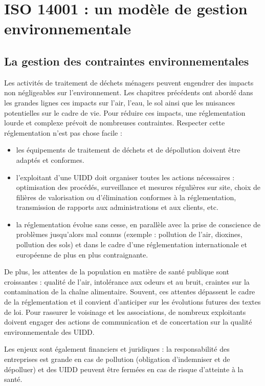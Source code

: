 \section{ISO 14001 : un modèle de gestion environnementale}

\subsection{La gestion des contraintes environnementales}

Les activités de traitement de déchets ménagers peuvent engendrer des impacts non 
négligeables sur l’environnement. Les chapitres précédents ont abordé dans les grandes lignes ces impacts sur l’air, l’eau, le sol ainsi que les nuisances potentielles sur le cadre de vie. 
Pour réduire ces impacts, une réglementation lourde et complexe prévoit de nombreuses contraintes. Respecter cette réglementation n’est pas chose facile : 

\begin{itemize}
\item les équipements de traitement de déchets et de dépollution doivent être adaptés et conformes. 
\item l’exploitant d’une UIDD doit organiser toutes les actions nécessaires : optimisation des procédés, surveillance et mesures régulières sur site, choix de filières de valorisation ou d’élimination conformes à la réglementation, transmission de rapports aux administrations et aux clients, etc.
\item  la réglementation évolue sans cesse, en parallèle avec la prise de conscience de 
problèmes jusqu’alors mal connus (exemple : pollution de l’air, dioxines, pollution des sols) et dans le cadre d’une réglementation internationale et européenne de plus en plus contraignante.

\end{itemize}


De plus, les attentes de la population en matière de santé publique sont croissantes : 
qualité de l’air, intolérance aux odeurs et au bruit, craintes sur la contamination de la chaîne alimentaire. Souvent, ces attentes dépassent le cadre de la réglementation et il convient d’anticiper sur les évolutions futures des textes de loi. Pour rassurer le voisinage et les associations, de nombreux exploitants doivent engager des actions de communication et de concertation sur la qualité environnementale des UIDD. 

Les enjeux sont également financiers et juridiques : la responsabilité des entreprises est grande en cas de pollution (obligation d’indemniser et de dépolluer) et des UIDD peuvent être fermées en cas de risque d’atteinte à la santé.
 

